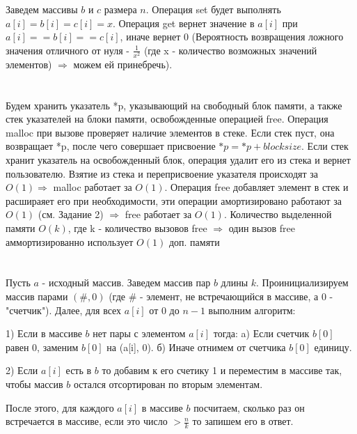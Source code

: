 \documentclass{article}
\begin{document}
\begin{flushleft}
Заведем массивы $b$ и $c$ размера $n$. Операция set будет выполнять $a[i] = b[i] = c[i] = x$. Операция get вернет значение в $a[i]$ при $a[i] == b[i] == c[i]$, иначе вернет 0 (Вероятность возвращения ложного значения отличного от нуля - $\frac{1}{x^2}$ (где x - количество возможных значений элементов) $\Rightarrow$ можем ей принебречь). 

\section{}

Будем хранить указатель *p, указывающий на свободный блок памяти, а также стек указателей на блоки памяти, освобожденные операцией free. Операция malloc при вызове проверяет наличие элементов в стеке. Если стек пуст, она возвращает *p, после чего совершает присвоение $*p = *p + blocksize$. Если стек хранит указатель на освобожденный блок, операция удалит его из стека и вернет пользователю. Взятие из стека и переприсвоение указателя происходят за $O(1) \Rightarrow$ malloc работает за $O(1)$. Операция free добавляет элемент в стек и расшираяет его при необходимости, эти операции амортизировано работают за $O(1)$ (см. Задание 2) $\Rightarrow$ free работает за $O(1)$. Количество выделенной памяти $O(k)$, где k - количество вызовов free $\Rightarrow$ один вызов free аммортизированно использует $O(1)$ доп. памяти

\section{}

Пусть $a$ - исходный массив. Заведем массив пар $b$ длины $k$. Проинициализируем массив парами $(\#, 0)$ (где \# - элемент, не встречающийся в массиве, а 0 - "счетчик"). Далее, для всех $a[i]$ от 0 до $n - 1$ выполним алгоритм:


1) Если в массиве $b$ нет пары с элементом $a[i]$ тогда: a) Если счетчик $b[0]$ равен 0, заменим $b[0]$ на (a[i], 0). б) Иначе отнимем от счетчика $b[0]$ единицу.


2) Если $a[i]$ есть в $b$ то добавим к его счетику 1 и переместим в массиве так, чтобы массив $b$ остался отсортирован по вторым элементам.

После этого, для каждого $a[i]$ в массиве $b$ посчитаем, сколько раз он встречается в массиве, если это число $> \frac{n}{k}$ то запишем его в ответ.

\section{}


\end{flushleft}
\end{document}

